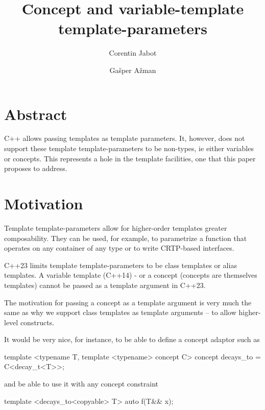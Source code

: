\documentclass{wg21}
\title{Concept and variable-template template-parameters}
\author{Corentin Jabot}{corentin.jabot@gmail.com}
\author{Gašper Ažman}{gasper.azman@gmail.com}
\begin{document}
\maketitle

\section{Abstract}

C++ allows passing templates as template parameters.
It, however, does not support these template template-parameters to be non-types, ie either variables or concepts.
This represents a hole in the template facilities, one that this paper proposes to address.

\section{Motivation}

Template template-parameters allow for higher-order templates greater composability.
They can be used, for example, to parametrize a function that operates on any container of any type or to write CRTP-based interfaces.

C++23 limits template template-parameters to be class templates or alias templates.
A variable template (C++14) - or a concept (concepts are themselves templates) cannot be passed as a template argument in C++23.

The motivation for passing a concept as a template argument is very much the same as why we support class templates as template arguments -- to allow higher-level constructs.

It would be very nice, for instance, to be able to define a concept adaptor such as

\begin{colorblock}
template <typename T, template <typename> concept C>
concept decays_to = C<decay_t<T>>;
\end{colorblock}

and be able to use it with any concept constraint

\begin{colorblock}
template <decays_to<copyable> T>
auto f(T&& x);
\end{colorblock}
\end{document}
